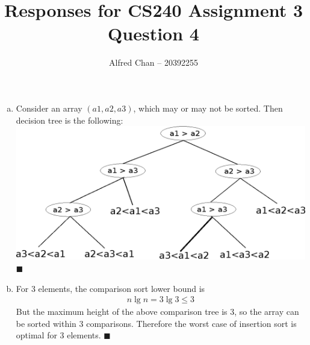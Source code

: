 \documentclass[12pt]{article}
\title{Responses for CS240 Assignment 3 Question 4}
\author{Alfred Chan -- 20392255}
\begin{document}
\maketitle
\begin{enumerate}[(a)]
\item
Consider an array $(a1,a2,a3)$, which may or may not be sorted. Then decision tree is the following:\\
\includegraphics[scale=0.8]{decision_tree.eps}
\hfill $\blacksquare$
\item
For 3 elements, the comparison sort lower bound is
\begin{align*}
n \lg n = 3 \lg 3 \le 3
\end{align*}
But the maximum height of the above comparison tree is 3, so the array can be sorted within 3 comparisons. Therefore the worst case of insertion sort is optimal for 3 elements.
\hfill $\blacksquare$
\end{enumerate}
\end{document}
